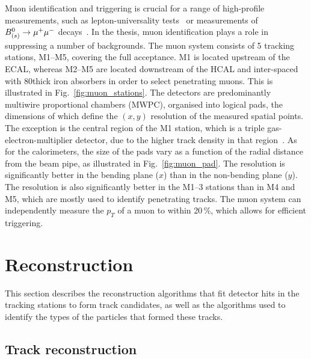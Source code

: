 Muon identification and triggering is crucial for a range of high-profile \lhcb measurements, such as lepton-universality tests~\cite{LHCb-PAPER-2019-009,LHCb-PAPER-2020-002} or measurements of  $B^0_{(s)}\rightarrow{\ensuremath{\mu^+}} \mu^-$ decays~\cite{LHCb-PAPER-2017-001}. In the thesis, muon identification plays a role in suppressing a number of backgrounds. The \lhcb muon system consists of 5 tracking stations, M1--M5, covering the full \lhcb acceptance. M1 is located upstream of the ECAL, whereas M2--M5 are located downstream of the HCAL and inter-spaced with 80\cm thick iron absorbers in order to select penetrating muons. This is illustrated in Fig.~\ref{fig:muon_stations}. The detectors are predominantly multiwire proportional chambers (MWPC), organised into logical pads, the dimensions of which define the $(x, y)$ resolution of the measured spatial points. The exception is the central region of the M1 station, which is a triple gas-electron-multiplier detector, due to the higher track density in that region~\cite{LHCb-TDR-5-add-2}. As for the calorimeters, the size of the pads vary as a function of the radial distance from the beam pipe, as illustrated in Fig.~\ref{fig:muon_pad}. The resolution is significantly better in the bending plane ($x$) than in the non-bending plane ($y$). The resolution is also significantly better in the M1--3 stations than in M4 and M5, which are mostly used to identify penetrating tracks. The muon system can independently measure the $p_T$ of a muon to within 20\,\%, which allows for efficient triggering.



\section{Reconstruction} %
\label{sec:reconstruction}

This section describes the reconstruction algorithms that fit detector hits in the tracking stations to form track candidates, as well as the algorithms used to identify the types of the particles that formed these tracks.


\subsection{Track reconstruction} %
\label{sub:track_reconstruction}

